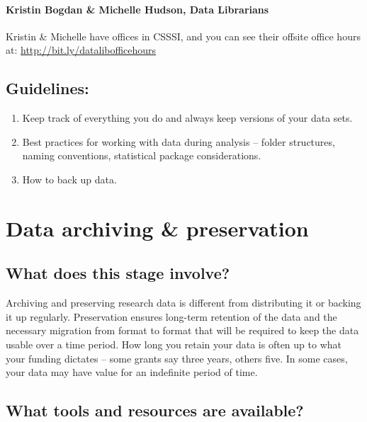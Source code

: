 \documentclass[]{article}
\begin{document}
\paragraph{Kristin Bogdan \& Michelle Hudson, Data
Librarians}\label{kristin-bogdan-michelle-hudson-data-librarians}

Kristin \& Michelle have offices in CSSSI, and you can see their offsite
office hours at: \url{http://bit.ly/datalibofficehours}

\subsection{Guidelines:}\label{guidelines-1}

\begin{enumerate}
\def\labelenumi{\arabic{enumi}.}
\itemsep1pt\parskip0pt
\item
  Keep track of everything you do and always keep versions of your data
  sets.
\item
  Best practices for working with data during analysis -- folder
  structures, naming conventions, statistical package considerations.
\item
  How to back up data.
\end{enumerate}

\section{Data archiving \&
preservation}\label{data-archiving-preservation}

\subsection{What does this stage
involve?}\label{what-does-this-stage-involve-3}

Archiving and preserving research data is different from distributing it
or backing it up regularly. Preservation ensures long-term retention of
the data and the necessary migration from format to format that will be
required to keep the data usable over a time period. How long you retain
your data is often up to what your funding dictates -- some grants say
three years, others five. In some cases, your data may have value for an
indefinite period of time.

\subsection{What tools and resources are
available?}\label{what-tools-and-resources-are-available-3}
\end{document}
